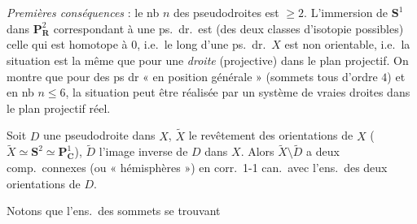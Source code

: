 \documentclass[11pt,a4paper]{article}
\begin{document}
\emph{Premières conséquences} : le nb $n$ des pseudodroites est $\geqslant 2$. L'immersion de $\mathbf{S}^1$ dans $\mathbf{P}^2_{\mathbf{R}}$ correspondant à une ps.\ dr.\ est (des deux classes d'isotopie possibles) celle qui est  homotope à $0$, i.e.\ le long d'une ps.\ dr.\ $X$ est non orientable, i.e.\ la situation est la même que pour une \emph{droite} (projective) dans le plan projectif. On montre que pour des ps dr « en position générale » (sommets tous d'ordre $4$) et en nb $n \leqslant 6$, la situation peut être réalisée par un système de vraies droites dans le plan projectif réel.

Soit $D$ une pseudodroite dans $X$, $\widetilde{X}$ le revêtement des orientations de $X$ ($\widetilde{X} \simeq \mathbf{S}^2 \simeq \mathbf{P}^1_{\mathbf{C}}$), $\widetilde{D}$ l'image inverse de $D$ dans $X$. Alors $\widetilde{X} \setminus \widetilde{D}$ a deux comp.\ connexes (ou « hémisphères ») en corr.\ 1-1 can.\ avec l'ens.\ des deux orientations de $D$.

Notons que  l'ens.\ des sommets se trouvant
\end{document}
